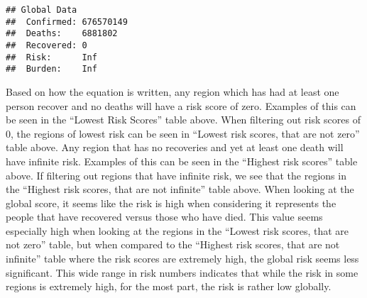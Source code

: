 \documentclass[
]{article}
\newenvironment{Shaded}{\begin{snugshade}}{\end{snugshade}}
\newcommand{\FunctionTok}[1]{\textcolor[rgb]{0.00,0.00,0.00}{#1}}
\newcommand{\NormalTok}[1]{#1}
\newcommand{\OtherTok}[1]{\textcolor[rgb]{0.56,0.35,0.01}{#1}}
\newcommand{\SpecialCharTok}[1]{\textcolor[rgb]{0.00,0.00,0.00}{#1}}
\newcommand{\StringTok}[1]{\textcolor[rgb]{0.31,0.60,0.02}{#1}}
\begin{document}
\begin{Shaded}
\end{Shaded}

\begin{verbatim}
## Global Data
##  Confirmed: 676570149 
##  Deaths:    6881802 
##  Recovered: 0 
##  Risk:      Inf 
##  Burden:    Inf
\end{verbatim}

Based on how the equation is written, any region which has had at least
one person recover and no deaths will have a risk score of zero.
Examples of this can be seen in the ``Lowest Risk Scores'' table above.
When filtering out risk scores of 0, the regions of lowest risk can be
seen in ``Lowest risk scores, that are not zero'' table above. Any
region that has no recoveries and yet at least one death will have
infinite risk. Examples of this can be seen in the ``Highest risk
scores'' table above. If filtering out regions that have infinite risk,
we see that the regions in the ``Highest risk scores, that are not
infinite'' table above. When looking at the global score, it seems like
the risk is high when considering it represents the people that have
recovered versus those who have died. This value seems especially high
when looking at the regions in the ``Lowest risk scores, that are not
zero'' table, but when compared to the ``Highest risk scores, that are
not infinite'' table where the risk scores are extremely high, the
global risk seems less significant. This wide range in risk numbers
indicates that while the risk in some regions is extremely high, for the
most part, the risk is rather low globally.
\end{document}
